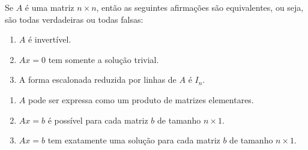 \documentclass{beamer}
\begin{document}
    \begin{frame}
        \begin{teorema}
            Se $A$ é uma matriz $n \times n$, \pause então as seguintes afirmações são equivalentes, \pause ou seja, são todas verdadeiras \pause ou todas falsas:\pause
            \begin{enumerate}[label={\roman*})]
                \item $A$ é invertível.\pause

                \vspace{1cm}

                \item $Ax = 0$ \pause tem somente a solução trivial.\pause

                \vspace{1cm}

                \item A forma escalonada reduzida por linhas \pause de $A$ é $I_n$.

                \seti
            \end{enumerate}
        \end{teorema}
    \end{frame}

    \begin{frame}
        \begin{teorema}
            \begin{enumerate}[label={\roman*})]
                \conti

                \item $A$ pode ser expressa como um produto de matrizes elementares.\pause

                \vspace{1cm}

                \item $Ax = b$ é possível \pause para cada matriz $b$ de tamanho $n \times 1$.\pause

                \vspace{1cm}

                \item $Ax = b$ tem exatamente uma solução \pause para cada matriz $b$ de tamanho $n \times 1$.
            \end{enumerate}
        \end{teorema}
    \end{frame}
\end{document}
